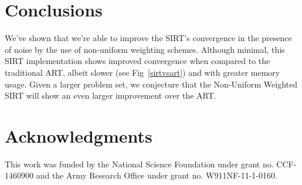 \documentclass{sig-alternate}
\begin{document}
\section{Conclusions}
We've shown that we're able to improve the SIRT's convergence in the presence of noise by the use of non-uniform weighting schemes. Although minimal, this SIRT implementation shows improved convergence when compared to the traditional ART, albeit slower (see Fig~\ref{sirtvsart}) and with greater memory usage. Given a larger problem set, we conjecture that the Non-Uniform Weighted SIRT will show an even larger improvement over the ART.


\section*{Acknowledgments}
This work was funded by the National Science Foundation under grant no. CCF-1460900 and the Army Research Office under grant no. W911NF-11-1-0160.


 
\end{document}

